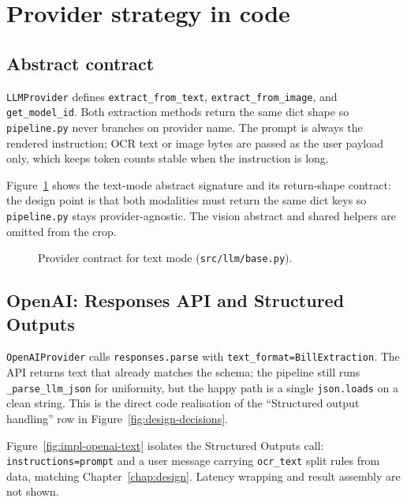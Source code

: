 
\section{Provider strategy in code}
\label{sec:impl-provider}

\subsection{Abstract contract}

\texttt{LLMProvider} defines \texttt{extract\_from\_text},
\texttt{extract\_from\_image}, and \texttt{get\_model\_id}. Both
extraction methods return the same dict shape so
\texttt{pipeline.py} never branches on provider name. The prompt is
always the rendered instruction; OCR text or image bytes are
passed as the user payload only, which keeps token counts stable
when the instruction is long.

Figure~\ref{fig:impl-llm-abc} shows the text-mode abstract signature and
its return-shape contract: the design point is that both modalities
must return the same dict keys so \texttt{pipeline.py} stays
provider-agnostic. The vision abstract and shared helpers are omitted
from the crop.

\begin{figure}[ht]
    \centering
    \caption{Provider contract for text mode (\texttt{src/llm/base.py}).}
    \label{fig:impl-llm-abc}
\end{figure}


\subsection{OpenAI: Responses API and Structured Outputs}

\texttt{OpenAIProvider} calls \texttt{responses.parse} with
\texttt{text\_format=BillExtraction}. The API returns text that
already matches the schema; the pipeline still runs
\texttt{\_parse\_llm\_json} for uniformity, but the happy path is a
single \texttt{json.loads} on a clean string. This is the direct
code realisation of the ``Structured output handling'' row in
Figure~\ref{fig:design-decisions}.

Figure~\ref{fig:impl-openai-text} isolates the Structured Outputs call:
\texttt{instructions=prompt} and a user message carrying
\texttt{ocr\_text} split rules from data, matching
Chapter~\ref{chap:design}. Latency wrapping and result assembly are
not shown.

